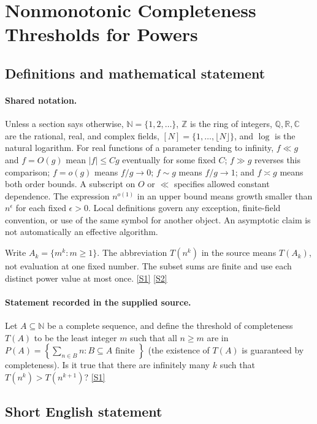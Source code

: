 \documentclass[11pt,a4paper]{article}
\newcommand{\N}{\mathbb{N}}
\newcommand{\Z}{\mathbb{Z}}
\newcommand{\Q}{\mathbb{Q}}
\newcommand{\R}{\mathbb{R}}
\newcommand{\C}{\mathbb{C}}
\newcommand{\sref}[2]{\hyperlink{source:#1:#2}{[S#2]}}
\begin{document}
\section{Nonmonotonic Completeness Thresholds for Powers}\label{statement}


\subsection{Definitions and mathematical statement}

\paragraph{Shared notation.}Unless a section says otherwise, $\N=\{1,2,\ldots\}$,
$\Z$ is the ring of integers, $\Q,\R,\C$ are the rational, real, and complex
fields, $[N]=\{1,\ldots,\lfloor N\rfloor\}$, and $\log$ is the natural
logarithm. For real functions of a parameter tending to infinity,
$f\ll g$ and $f=O(g)$ mean $|f|\leq Cg$ eventually for some fixed $C$;
$f\gg g$ reverses this comparison; $f=o(g)$ means $f/g\to0$;
$f\sim g$ means $f/g\to1$; and $f\asymp g$ means both order bounds.
A subscript on $O$ or $\ll$ specifies allowed constant dependence.
The expression $n^{o(1)}$ in an upper bound means growth smaller than
$n^\epsilon$ for each fixed $\epsilon>0$. Local definitions govern any
exception, finite-field convention, or use of the same symbol for another
object. An asymptotic claim is not automatically an effective algorithm.



Write $A_k=\{m^k:m\geq1\}$. The abbreviation $T(n^k)$ in the source means $T(A_k)$, not evaluation at one fixed number. The subset sums are finite and use each distinct power value at most once. \sref{statement}{1} \sref{statement}{2}

\paragraph{Statement recorded in the supplied source.}
Let $A\subseteq \mathbb{N}$ be a complete sequence, and define the threshold of completeness $T(A)$ to be the least integer $m$ such that all $n\geq m$ are in $ P(A) = \left\{\sum_{n\in B}n : B\subseteq A\textrm{ finite }\right\} $ (the existence of $T(A)$ is guaranteed by completeness).
Is it true that there are infinitely many $k$ such that $T(n^k)>T(n^{k+1})$? \sref{statement}{1}

\subsection{Short English statement}
\end{document}
